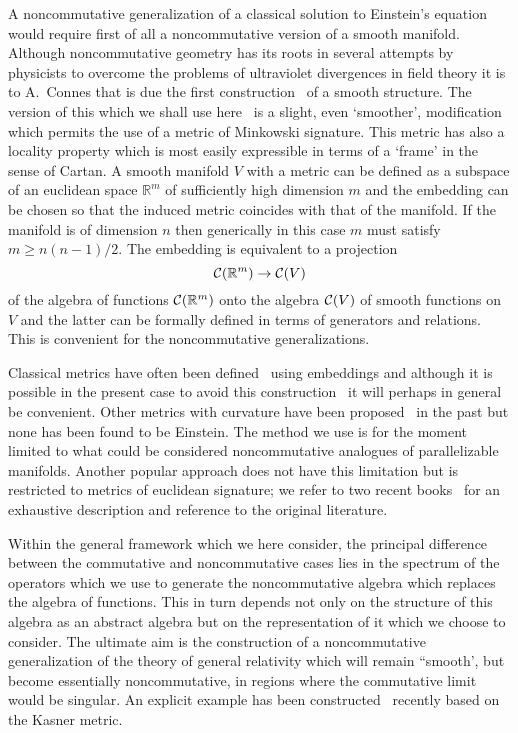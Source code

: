 \documentclass[12pt,a4paper]{article}
\newcounter{eg}
\def\b#1{{\mathbb #1}}
\def\c#1{{\cal #1}}
\begin{document}
A noncommutative generalization of a classical solution to Einstein's
equation would require first of all a noncommutative version of a
smooth manifold. Although noncommutative geometry has its roots in
several attempts by physicists to overcome the problems of ultraviolet
divergences in field theory it is to A.~Connes that is due the first
construction~\cite{Con94} of a smooth structure. The version of this
which we shall use here~\cite{Mad00c} is a slight, even `smoother',
modification which permits the use of a metric of Minkowski signature.
This metric has also a locality property which is most easily
expressible in terms of a `frame' in the sense of Cartan. A smooth
manifold $V$ with a metric can be defined as a subspace of an
euclidean space $\b{R}^m$ of sufficiently high dimension $m$ and the
embedding can be chosen so that the induced metric coincides with that
of the manifold. If the manifold is of dimension $n$ then generically
in this case $m$ must satisfy $m \geq n(n-1)/2$. The embedding is
equivalent to a projection 
$$
\c{C}(\b{R}^m) \rightarrow \c{C}(V)
$$
of the algebra of functions $\c{C}(\b{R}^m)$ onto the algebra
$\c{C}(V)$ of smooth functions on $V$ and the latter can be formally
defined in terms of generators and relations.  This is convenient for
the noncommutative generalizations. 

Classical metrics have often been
defined~\cite{LidRomTavRip97,PavTap01} using embeddings and although
it is possible in the present case to avoid this
construction~\cite{DesPirRob76} it will perhaps in general
be convenient.  Other metrics with curvature have been
proposed~\cite{Mad89c,AscCas93} in the past but none
has been found to be Einstein. The method we use is for the moment
limited to what could be considered noncommutative analogues of
parallelizable manifolds. Another popular approach does not have this
limitation but is restricted to metrics of euclidean signature; we
refer to two recent books~\cite{Lan97,FigGraVar00} for an exhaustive
description and reference to the original literature.

Within the general framework which we here consider, the principal
difference between the commutative and noncommutative cases lies in
the spectrum of the operators which we use to generate the
noncommutative algebra which replaces the algebra of functions. This
in turn depends not only on the structure of this algebra as an abstract
algebra but on the representation of it which we choose to
consider. The ultimate aim is the construction of a noncommutative
generalization of the theory of general relativity which will remain
``smooth', but become essentially noncommutative, in regions where the
commutative limit would be singular. An explicit example has been
constructed~\cite{MacMadZou02} recently based on the Kasner metric.
\end{document}
